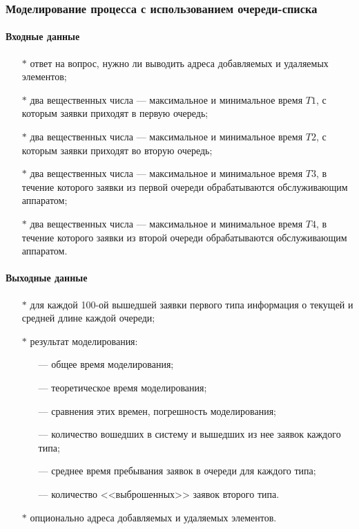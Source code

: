 \documentclass[a4paper,12pt]{extarticle}
\begin{document}
\subsubsection{Моделирование процесса с использованием очереди-списка}

\paragraph{Входные данные}
\begin{itemize}
    \item[$*$] ответ на вопрос, нужно ли выводить адреса добавляемых и удаляемых элементов;
    \item[$*$] два вещественных числа --- максимальное и минимальное время $T1$, с которым заявки приходят в первую очередь;
    \item[$*$] два вещественных числа --- максимальное и минимальное время $T2$, с которым заявки приходят во вторую очередь;
    \item[$*$] два вещественных числа --- максимальное и минимальное время $T3$, в течение которого заявки из первой очереди обрабатываются обслуживающим аппаратом;
    \item[$*$] два вещественных числа --- максимальное и минимальное время $T4$, в течение которого заявки из второй очереди обрабатываются обслуживающим аппаратом.
\end{itemize}

\paragraph{Выходные данные}
\begin{itemize}
    \item[$*$] для каждой 100-ой вышедшей заявки первого типа информация о текущей и средней длине каждой очереди;
    \item[$*$] результат моделирования:
    \begin{itemize}
    	\item[---] общее время моделирования;
    	\item[---] теоретическое время моделирования;
    	\item[---] сравнения этих времен, погрешность моделирования;
    	\item[---] количество вошедших в систему и вышедших из нее заявок каждого типа;
    	\item[---] среднее время пребывания заявок в очереди для каждого типа;
    	\item[---] количество <<выброшенных>> заявок второго типа.
    \end{itemize}
    \item[$*$] опционально адреса добавляемых и удаляемых элементов.
\end{itemize}
\end{document}
